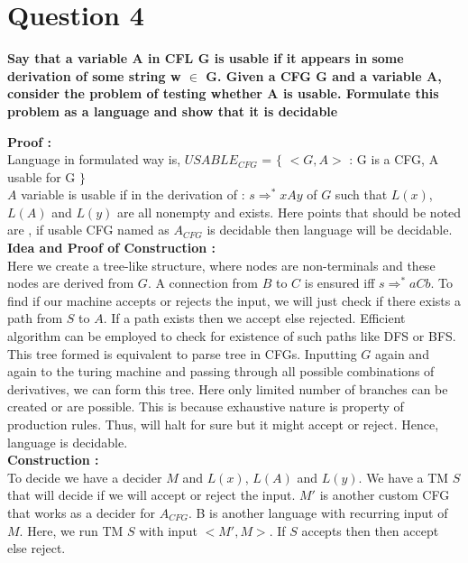 \documentclass{article}
\begin{document}
\pagebreak


\section{Question 4}

\textbf{Say that a variable A in CFL G is usable if it appears in some derivation of some string
w $\in$ G. Given a CFG G and a variable A, consider the problem of testing whether A is
usable. Formulate this problem as a language and show that it is decidable\\}

{\large \textbf{Proof : \\}}
\vspace{10pt}
Language in formulated way is,
$USABLE_{CFG}$ = $\{$ $<$$G,A$$>$ : G is a CFG, A usable for G $\}$
\\

$A$ variable is usable if in the derivation of : $s\Rightarrow^*xAy$ of $G$ such that $L(x)$, $L(A)$ and $L(y)$ are all nonempty and exists.
Here points that should be noted are , if usable CFG named as $A_{CFG}$ is decidable then language will be decidable.\\

{\large \textbf{Idea and Proof of Construction : \\}}
Here we create a tree-like structure, where nodes are non-terminals and these nodes are derived from $G$. A connection from $B$ to $C$ is ensured iff $s\Rightarrow^*aCb$.  To find if our machine accepts or rejects the input, we will just check if there exists a path from $S$ to $A$. If a path exists then we accept else rejected. Efficient algorithm can be employed to check for existence of such paths like DFS or BFS. This tree formed is equivalent to parse tree in CFGs. Inputting $G$ again and again to the turing machine and passing through all possible combinations of derivatives, we can form this tree. Here only limited number of branches can be created or are possible. This is because exhaustive nature is property of production rules. Thus, will halt for sure but it might accept or reject. Hence, language is decidable. \\

{\large \textbf{Construction : \\}}
To decide we have a decider $M$ and $L(x)$, $L(A)$ and $L(y)$. We have a TM $S$ that will decide if we will accept or reject the input. $M'$ is another custom CFG that works as a decider for $A_{CFG}$. B is another language with recurring input of $M$. Here, we run TM $S$ with input $<M',M>$. If $S$ accepts then then accept else reject. 
\end{document}
